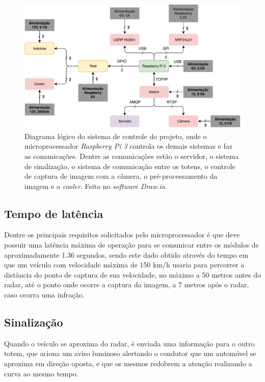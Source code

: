      \begin{figure}[H]
    \centering
   \includegraphics[scale = 0.6]{figuras/Diagram_Geral.pdf}
   \caption{Diagrama lógico do sistema de controle do projeto, onde o microprocessador \emph{Raspberry Pi 3} controla os demais sistemas e faz as comunicações. Dentre as comunicações estão o servidor, o sistema de sinalização, o sistema de comunicação entre os totens, o controle de captura de imagem com a câmera, o pré-processamento da imagem e o \textit{cooler}. Feito no \emph{software Draw.io}.}
   \label{comunicacao}
    \end{figure}
    

\subsection{Tempo de latência}\label{tempo_latencia}

Dentre os principais requisitos solicitados pelo microprocessador é que deve possuir uma latência máxima de operação para se comunicar entre os módulos de aproximadamente 1.36 segundos, sendo este dado obtido através do tempo em que um veículo com velocidade máxima de 150 km/h usaria para percorrer a distância do ponto de captura de sua velocidade, no máximo a 50 metros antes do radar, até o ponto onde ocorre a captura da imagem, a 7 metros após o radar, caso ocorra uma infração. 
      
\subsection{Sinalização}
    
Quando o veículo se aproxima do radar, é enviada uma informação para o outro totem, que aciona um aviso luminoso alertando o condutor que um automóvel se aproxima em direção oposta, e que os mesmos redobrem a atenção realizando a curva ao mesmo tempo. 

